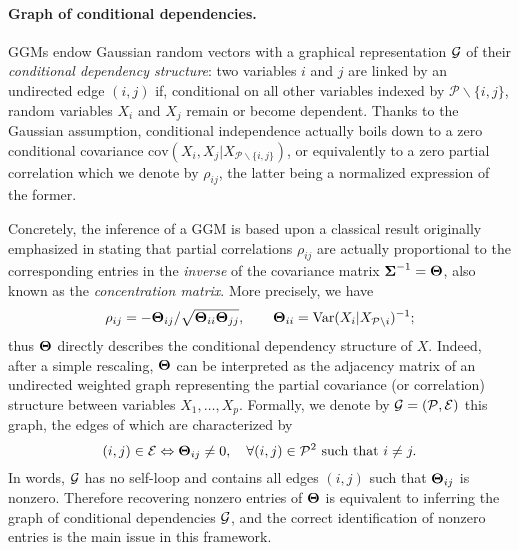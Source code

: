 \paragraph*{Graph of  conditional dependencies.}  GGMs  endow Gaussian
random  vectors  with a  graphical  representation  $\mathcal{G}$ of  their
\emph{conditional dependency structure}: two variables $i$ and $j$ are
linked  by an  undirected edge  $(i,j)$ if,  conditional on  all other
variables   indexed  by   $\mathcal{P}  \backslash   \{i,j\}$,  random
variables $X_i$ and  $X_j$ remain or become dependent.   Thanks to the
Gaussian assumption, conditional independence actually boils down to a
zero  conditional  covariance $\textrm{cov}(X_i,X_j  |  X_{\mathcal{P}
  \backslash \{i,j\}})$, or equivalently to a zero partial correlation
which  we  denote  by  $\rho_{ij}$,  the  latter  being  a  normalized
expression of the former.

Concretely, the  inference of a GGM  is based upon a  classical result
originally emphasized in  \cite{1972_Biometrics_Dempster} stating that
partial  correlations $\rho_{ij}$  are  actually  proportional to  the
corresponding entries  in the \emph{inverse} of  the covariance matrix
${\boldsymbol\Sigma}^{-1}  =   \boldsymbol\Theta$,  also  known  as   the  \emph{concentration
  matrix}. More precisely, we have
\begin{equation}
  \label{eq:parcor2invcov}
  \rho_{ij}      =  -\boldsymbol\Theta_{ij}      /
  \sqrt{\boldsymbol\Theta_{ii} \boldsymbol\Theta_{jj}}, \qquad \boldsymbol\Theta_{ii}=
  \mathrm{Var}(X_i|X_{\mathcal{P}\backslash i})^{-1};
\end{equation}
thus $\boldsymbol\Theta$ directly describes the conditional dependency structure
of $X$. Indeed, after a simple rescaling, $\boldsymbol\Theta$ can be interpreted
as the adjacency  matrix of an undirected  weighted graph representing
the partial  covariance (or  correlation) structure  between variables
$X_{1},\ldots,X_{p}$. Formally,  we denote by $\mathcal{G}  = (\mathcal{P},
\mathcal{E})$ this graph, the edges of which are characterized by
\begin{displaymath}
  (i,j) \in \mathcal{E} \Leftrightarrow \boldsymbol\Theta_{ij} \neq 0, \quad \forall
  (i,j) \in \mathcal{P}^2 \text{ such that } i\neq j.
\end{displaymath}
In words,  $\mathcal{G}$ has  no self-loop and  contains all  edges $(i,j)$
such  that $\boldsymbol\Theta_{ij}$  is nonzero.   Therefore recovering  nonzero
entries  of  $\boldsymbol\Theta$  is  equivalent   to  inferring  the  graph  of
conditional dependencies  $\mathcal{G}$, and the correct  identification of
nonzero entries is the main issue in this framework.


